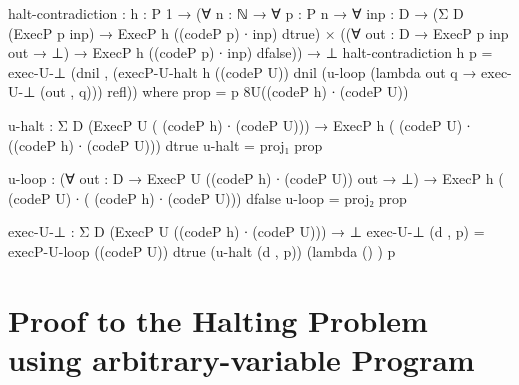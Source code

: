 \documentclass{jfrarticle}
\begin{document}
\begin{code}[fontsize=\small]
halt-contradiction : {h : P 1}
                   → (∀ {n : ℕ} → ∀ {p : P n} → ∀ {inp : D}
                      → (Σ D (ExecP p inp) 
			  → ExecP h ((codeP p) ∙ inp) dtrue)
                      ×  ((∀ {out : D} → ExecP p inp out → ⊥) 
			  → ExecP h ((codeP p) ∙ inp) dfalse))
                   → ⊥
halt-contradiction {h} p = exec-U-⊥ (dnil , 
				      (execP-U-halt {h} ((codeP U)) dnil 
				        (u-loop 
					  (lambda {out} q 
					      → exec-U-⊥ (out , q))) 
					refl))
  where
    prop = p {8}{U}{((codeP h) ∙ (codeP U))}
    
    u-halt : Σ D (ExecP U ( (codeP h) ∙ (codeP U))) 
	→ ExecP h ( (codeP U) ∙ ((codeP h) ∙ (codeP U))) dtrue
    u-halt = proj₁ prop

    u-loop : (∀ {out : D} → ExecP U ((codeP h) ∙  (codeP U)) out → ⊥) 
	→ ExecP h ( (codeP U) ∙ ( (codeP h) ∙  (codeP U))) dfalse
    u-loop = proj₂ prop

    exec-U-⊥ : Σ D (ExecP U ((codeP h) ∙ (codeP U))) → ⊥
    exec-U-⊥ (d , p) = execP-U-loop ((codeP U)) dtrue 
			(u-halt (d , p)) (lambda { () }) p
\end{code}

\section{Proof to the Halting Problem using arbitrary-variable Program}
\end{document}
